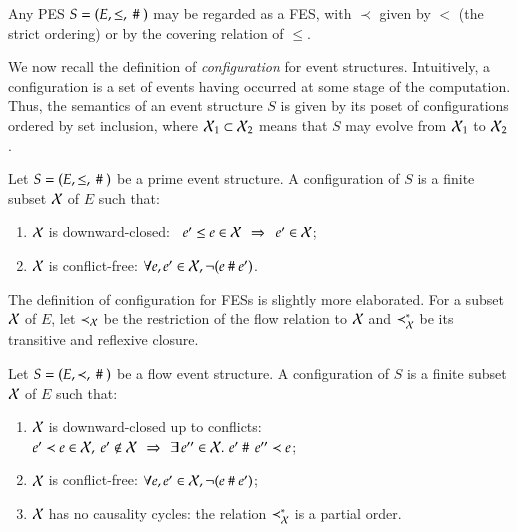 Any PES $S = (E , \leq, ~\#~)$ may be regarded as a FES, with $\prec$
given by $<$ (the strict ordering) %
or by the covering relation of $\leq$.

\bigskip

We now recall the definition of {\sl configuration}\/ for event
structures. Intuitively, a configuration is a set of events having
occurred at some stage of the computation.   Thus, the semantics
of an event structure $S$ is given by its poset of configurations ordered
by set inclusion, where $\mathcal{X}_1 \subset \mathcal{X}_2$ means that $S$ may evolve
from $\mathcal{X}_1$ to $\mathcal{X}_2$. 
%
\begin{definition} 
  Let $S=(E,\leq, ~\#~)$ be a prime event structure. A
    configuration of $S$ is a finite subset $\mathcal{X}$ of $E$ such that:
\begin{enumerate}
    \item {} $\mathcal{X}$ is downward-closed: \ $e'\leq e \in \mathcal{X} \, \ \Rightarrow \ \ e'\in \mathcal{X}$; 
 \item {} $\mathcal{X}$ is conflict-free: $\forall e, e' \in \mathcal{X}, \neg (e ~\#~
e')$.
\end{enumerate}
\end{definition}
%
The definition of
configuration for FESs is slightly more elaborated.
%
%
For a subset $\mathcal{X}$ of
$E$, let $\prec_{\mathcal{X}}$ be the restriction of the flow relation to $\mathcal{X}$ and
$ \prec_{\mathcal{X}}^*$ be its transitive and reflexive closure.
%
\begin{definition}
Let $S=(E,\prec, ~\#~)$ be a flow event
structure. A configuration of $S$ is a finite
subset $\mathcal{X}$ of $E$ such that:
\begin{enumerate}
\item{} $\mathcal{X}$ is downward-closed up to conflicts: 
\ $e'\prec e \in \ESet, \ e'\notin \ESet\, \  \impl \ 
\,\exists \, e''\in \ESet.\,\, e'\gr \,e''\prec e$;
\item{} $\mathcal{X}$ is conflict-free: $\forall e, e' \in \mathcal{X}, \neg (e ~\#~
e')$;
\item{} $\mathcal{X}$ has no causality cycles: the relation $ \prec_{\mathcal{X}}^*$  is a partial order.
\end{enumerate}
\end{definition}
